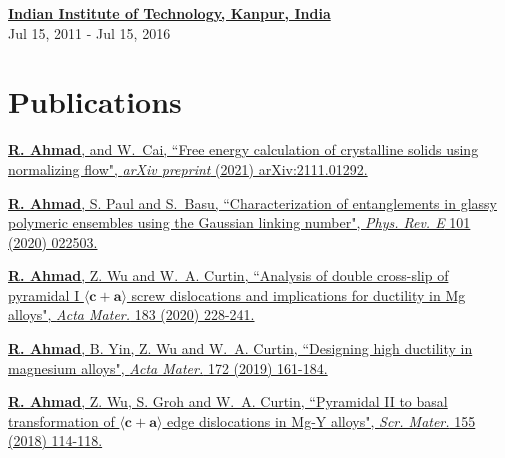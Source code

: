 \documentclass[margin,line]{resume}
\begin{document}
\begin{resume}
    \textbf{\href{http://www.iitk.ac.in/}{\textsf{Indian Institute of Technology, Kanpur, India}}}\vspace{0mm}\\
     \hfill \small{Jul 15, 2011 - Jul 15, 2016}
    \vspace{-0.3cm}

    \section{\mysidestyle Publications}

    \href{https://arxiv.org/abs/2111.01292} {\textbf{R. Ahmad}, and W.~Cai, ``Free energy calculation of crystalline solids using normalizing flow", \textit{arXiv preprint} (2021) arXiv:2111.01292.}

    \href{https://journals.aps.org/pre/abstract/10.1103/PhysRevE.101.022503} {\textbf{R. Ahmad}, S. Paul and S.~Basu, ``Characterization of entanglements in glassy polymeric ensembles using the Gaussian linking number", \textit{Phys. Rev. E} 101 (2020) 022503.}

    \href{https://www.sciencedirect.com/science/article/pii/S1359645419307256} {\textbf{R. Ahmad}, Z. Wu and W.~A.
        Curtin, ``Analysis of double cross-slip of pyramidal I $\langle \boldsymbol{c} + \boldsymbol{a} \rangle$ screw dislocations and implications for ductility in Mg alloys", \textit{Acta Mater.} 183 (2020) 228-241.}

    \href{https://www.sciencedirect.com/science/article/pii/S1359645419302198} {\textbf{R. Ahmad}, B. Yin, Z. Wu and W.~A. Curtin, ``Designing high ductility in magnesium alloys", \textit{Acta Mater.} 172 (2019) 161-184.}

    \href{https://www.sciencedirect.com/science/article/pii/S1359646218303804}{\textbf{R. Ahmad}, Z. Wu, S. Groh and W.~A. Curtin, ``Pyramidal II to basal transformation of $\langle \boldsymbol{c} + \boldsymbol{a} \rangle$ edge dislocations in Mg-Y alloys", \textit{Scr. Mater.} 155 (2018) 114-118.}


\end{resume}
\end{document}

